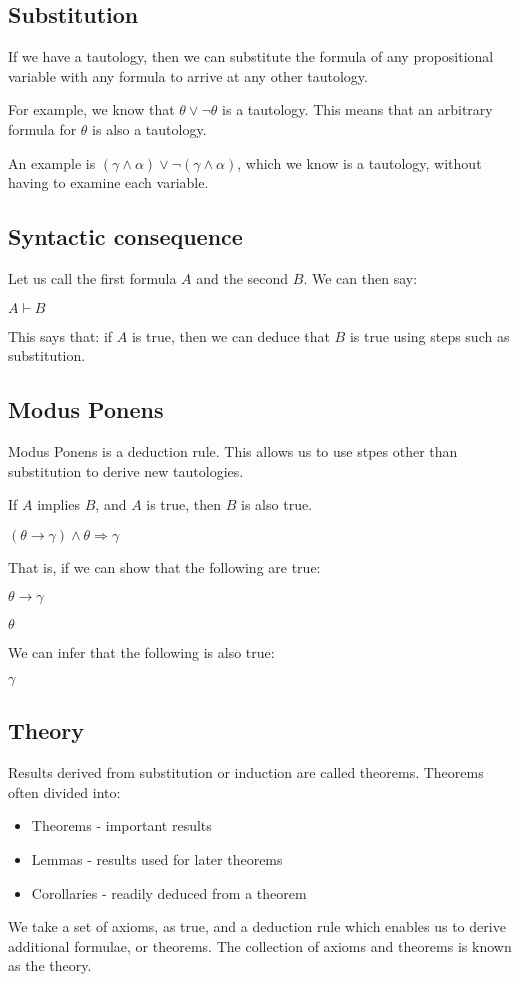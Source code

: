 \subsection{Substitution}

If we have a tautology, then we can substitute the formula of any propositional variable with any formula to arrive at any other tautology.

For example, we know that \(\theta \lor \neg \theta \) is a tautology. This means that an arbitrary formula for \(\theta \) is also a tautology.

An example is \((\gamma \land \alpha )\lor \neg (\gamma \land \alpha )\), which we know is a tautology, without having to examine each variable.

\subsection{Syntactic consequence}

Let us call the first formula \(A\) and the second \(B\). We can then say:

\(A\vdash B\)

This says that: if \(A\) is true, then we can deduce that \(B\) is true using steps such as substitution.

\subsection{Modus Ponens}

Modus Ponens is a deduction rule. This allows us to use stpes other than substitution to derive new tautologies.

If \(A\) implies \(B\), and \(A\) is true, then \(B\) is also true.

\((\theta \rightarrow \gamma )\land \theta \Rightarrow \gamma \)

That is, if we can show that the following are true:

\(\theta \rightarrow \gamma \)

\(\theta \)

We can infer that the following is also true:

\(\gamma \)

\subsection{Theory}

Results derived from substitution or induction are called theorems. Theorems often divided into:

\begin{itemize}
\item Theorems - important results
\item Lemmas - results used for later theorems
\item Corollaries - readily deduced from a theorem
\end{itemize}

We take a set of axioms, as true, and a deduction rule which enables us to derive additional formulae, or theorems. The collection of axioms and theorems is known as the theory.
